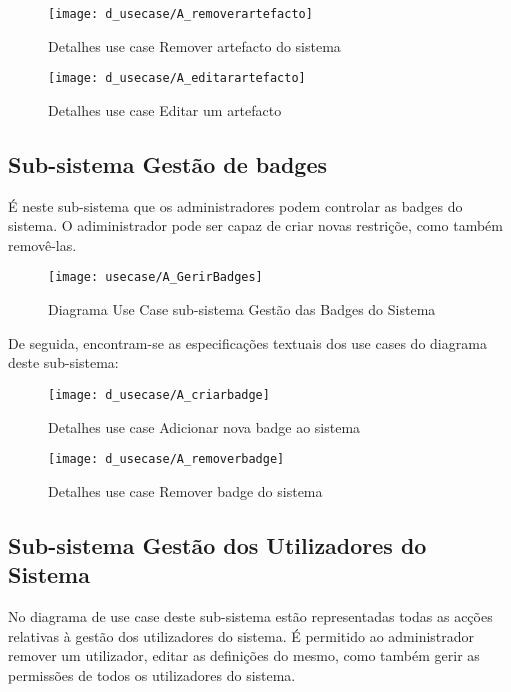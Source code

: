 \documentclass[12pt,a4paper]{article}
\begin{document}
\begin{figure}[h!]
\centering
\texttt{[image: d\_usecase/A\_removerartefacto]}
\label{usecase}
\caption{Detalhes use case Remover artefacto do sistema}
\end{figure}

\begin{figure}[h!]
\centering
\texttt{[image: d\_usecase/A\_editarartefacto]}
\label{usecase}
\caption{Detalhes use case Editar um artefacto}
\end{figure}

\clearpage

\subsection{Sub-sistema Gestão de badges}
É neste sub-sistema que os administradores podem controlar as badges do sistema. O
adiministrador pode ser capaz de criar novas restriçõe, como também removê-las.\\

\begin{figure}[h!]
\centering
\texttt{[image: usecase/A\_GerirBadges]}
\label{usecase}
\caption{Diagrama Use Case sub-sistema Gestão das Badges do Sistema}
\end{figure}

De seguida, encontram-se as especificações textuais dos use cases do diagrama deste sub-sistema:\\

\begin{figure}[h!]
\centering
\texttt{[image: d\_usecase/A\_criarbadge]}
\label{usecase}
\caption{Detalhes use case Adicionar nova badge ao sistema}
\end{figure}

\begin{figure}[h!]
\centering
\texttt{[image: d\_usecase/A\_removerbadge]}
\label{usecase}
\caption{Detalhes use case Remover badge do sistema}
\end{figure}

\clearpage

\subsection{Sub-sistema Gestão dos Utilizadores do Sistema}
No diagrama de use case deste sub-sistema estão representadas todas as acções relativas
à gestão dos utilizadores do sistema. É permitido ao administrador remover um utilizador, editar as definições do mesmo, como também gerir as permissões de todos os utilizadores do sistema. \\
\end{document}
